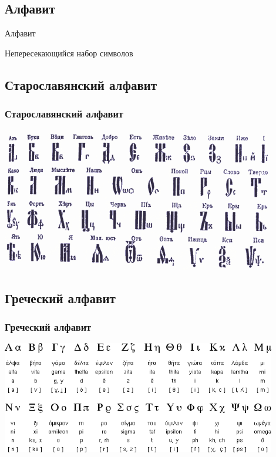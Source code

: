 \documentclass[compress,red]{beamer}
\begin{document}
\subsection{Алфавит}
\begin{frame}
  \begin{center}
    \Huge{Алфавит}
  \end{center}
  \begin{center}
    \Large{Непересекающийся набор символов}
  \end{center}
\end{frame}

\subsection{Старославянский алфавит}
\begin{frame}[fragile]
  \frametitle{Старославянский алфавит}
  \centerline{\includegraphics[width=0.9\textwidth]{images/alphabet_old_slavic.png}}
\end{frame}

\subsection{Греческий алфавит}
\begin{frame}[fragile]
  \frametitle{Греческий алфавит}
  \centerline{\includegraphics[width=0.9\textwidth]{images/alphabet_greek.png}}
\end{frame}
\end{document}
